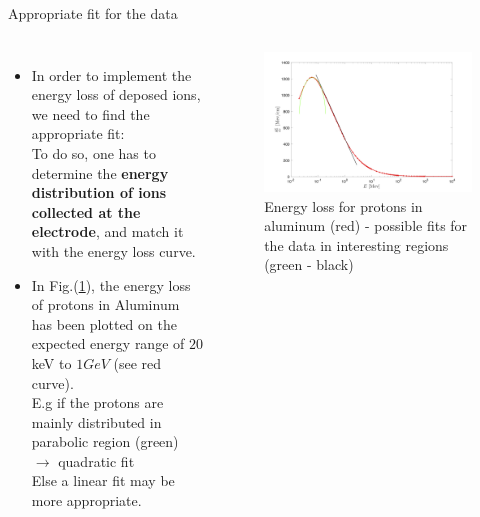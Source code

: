 \documentclass[aspectratio=169,xcolor=dvipsnames,8pt]{beamer}
\begin{document}
 \begin{frame}{Appropriate fit for the data}
     \begin{columns}[c] %

	\begin{itemize}


		\item{In order to implement the energy loss of deposed ions, we need to find the appropriate fit:\\
		To do so, one has to determine the \textbf{energy distribution of ions collected at the electrode}, and match it with the energy loss curve.
		}
		\item{In Fig.(\ref{fig2}), the energy loss of protons in Aluminum has been plotted on the expected energy range of $20$ keV to $1GeV$ (see red curve).\\
		E.g if the protons are mainly distributed in parabolic region (green) $\rightarrow$ quadratic fit\\
		Else a linear fit may be more appropriate.
		}
				
						
	\end{itemize}

		\begin{figure}[h!]
		\includegraphics[width=1 \textwidth]{fit.png}
		\caption{\label{fig2} Energy loss for protons in aluminum (red) - possible fits for the data in interesting regions (green - black)}
		\end{figure}
     \end{columns}
\end{frame}
\end{document}
